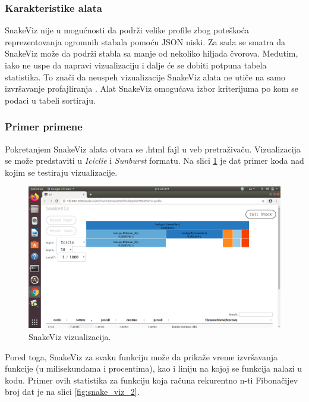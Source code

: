 \documentclass[a4paper]{article}
\begin{document}
\subsubsection{Karakteristike alata}
 SnakeViz nije u mogućnosti da podrži velike profile zbog poteškoća reprezentovanja ogromnih stabala pomoću JSON niski. Za sada se smatra da SnakeViz može da podrži stabla sa manje od nekoliko hiljada čvorova. Međutim, iako ne uspe da napravi vizualizaciju i dalje će se dobiti potpuna tabela statistika. To znači da neuspeh vizualizacije SnakeViz alata ne utiče na samo izvršavanje profajliranja \cite{SnakeViz2}. Alat SnakeViz omogućava izbor kriterijuma po kom se podaci u tabeli sortiraju.
\subsubsection{Primer primene}
Pokretanjem SnakeViz alata otvara se .html fajl u veb pretraživaču. Vizualizacija se može predstaviti u {\em Iciclie} i {\em Sunburst} formatu. Na slici \ref{fig:snake_viz_1} je dat primer koda nad kojim se testiraju vizualizacije.
\begin{figure}[h!]
\begin{center}
\includegraphics[trim={10cm 15cm 5cm 6.5cm},clip,scale=0.35]{MVJ_02_ProfajleriZaPython_ZecevicSmiljanicMilovanovicPopov/snakeviz1.png}
\end{center}
\caption{SnakeViz vizualizacija.}
\label{fig:snake_viz_1}
\end{figure}
Pored toga, SnakeViz za svaku funkciju može da prikaže vreme izvršavanja funkcije (u milisekundama i procentima), kao i liniju na kojoj se funkcija nalazi u kodu. Primer ovih statistika za funkciju koja računa rekurentno n-ti Fibonačijev broj dat je na slici \ref{fig:snake_viz_2}.
\end{document}
